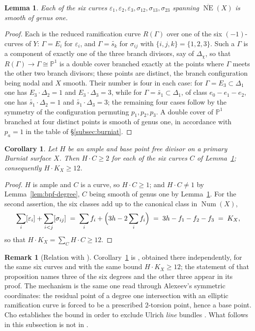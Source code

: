\documentclass{amsart}
\newtheorem{lemma}[theorem]{Lemma}
\newtheorem{corollary}[theorem]{Corollary}
\theoremstyle{definition}
\newtheorem{remark}[theorem]{Remark}
\newcommand{\PP}{\mathbb{P}}
\newcommand{\Num}{\operatorname{Num}}
\newcommand{\NE}{\overline{\operatorname{NE}}}
\begin{document}
\begin{lemma}\label{lem:six-elliptic}
Each of the six curves $\varepsilon_1,\varepsilon_2,\varepsilon_3,\sigma_{12},\sigma_{13},\sigma_{23}$ spanning $\NE(X)$ is smooth of genus one.
\end{lemma}

\begin{proof}
Each is the reduced ramification curve $R(\Gamma)$ over one of the six $(-1)$-curves of $Y$: $\Gamma=E_i$ for $\varepsilon_i$, and $\Gamma=\widetilde{s_k}$ for $\sigma_{ij}$ with $\{i,j,k\}=\{1,2,3\}$. Such a $\Gamma$ is a component of exactly one of the three branch divisors, say of $\Delta_\chi$, so that $R(\Gamma)\to\Gamma\cong\PP^1$ is a double cover branched exactly at the points where $\Gamma$ meets the other two branch divisors; these points are distinct, the branch configuration being nodal and $X$ smooth. Their number is four in each case: for $\Gamma=E_3\subset\Delta_1$ one has $E_3\cdot\Delta_2=1$ and $E_3\cdot\Delta_3=3$, while for $\Gamma=\widetilde{s_1}\subset\Delta_1$, of class $e_0-e_1-e_2$, one has $\widetilde{s_1}\cdot\Delta_2=1$ and $\widetilde{s_1}\cdot\Delta_3=3$; the remaining four cases follow by the symmetry of the configuration permuting $p_1,p_2,p_3$. A double cover of $\PP^1$ branched at four distinct points is smooth of genus one, in accordance with $p_a=1$ in the table of \S\ref{subsec:burniat}.
\end{proof}

\begin{corollary}\label{cor:degreetwo}
Let $H$ be an ample and base point free divisor on a primary Burniat surface $X$. Then $H\cdot C\ge2$ for each of the six curves $C$ of Lemma~\ref{lem:six-elliptic}; consequently $H\cdot K_X\ge12$.
\end{corollary}

\begin{proof}
$H$ is ample and $C$ is a curve, so $H\cdot C\ge1$; and $H\cdot C\neq1$ by Lemma~\ref{lem:bpf-degree}, $C$ being smooth of genus one by Lemma~\ref{lem:six-elliptic}. For the second assertion, the six classes add up to the canonical class in $\Num(X)$,
\[
\sum_{i}[\varepsilon_i]+\sum_{i<j}[\sigma_{ij}]
\;=\;\sum_i f_i+\Bigl(3h-2\sum_i f_i\Bigr)
\;=\;3h-f_1-f_2-f_3\;=\;K_X ,
\]
so that $H\cdot K_X=\sum_C H\cdot C\ge12$.
\end{proof}

\begin{remark}[Relation with \cite{Cho26}]\label{rem:cho-degreetwo}
Corollary~\ref{cor:degreetwo} is \cite[Prop.~5.4 and its proof]{Cho26}, obtained there independently, for the same six curves and with the same bound $H\cdot K_X\ge12$; the statement of that proposition names three of the six degrees and the other three appear in its proof. The mechanism is the same one read through Alexeev's symmetric coordinates: the residual point of a degree one intersection with an elliptic ramification curve is forced to be a prescribed $2$-torsion point, hence a base point. Cho establishes the bound in order to exclude Ulrich \emph{line} bundles \cite[Thm.~5.5]{Cho26}. What follows in this subsection is not in \cite{Cho26}.
\end{remark}
\end{document}

